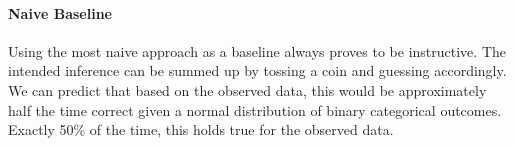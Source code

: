 \documentclass[
]{article}
\newenvironment{Shaded}{\begin{snugshade}}{\end{snugshade}}
\newcommand{\AttributeTok}[1]{\textcolor[rgb]{0.77,0.63,0.00}{#1}}
\newcommand{\CommentTok}[1]{\textcolor[rgb]{0.56,0.35,0.01}{\textit{#1}}}
\newcommand{\ConstantTok}[1]{\textcolor[rgb]{0.00,0.00,0.00}{#1}}
\newcommand{\FunctionTok}[1]{\textcolor[rgb]{0.00,0.00,0.00}{#1}}
\newcommand{\NormalTok}[1]{#1}
\newcommand{\OtherTok}[1]{\textcolor[rgb]{0.56,0.35,0.01}{#1}}
\newcommand{\SpecialCharTok}[1]{\textcolor[rgb]{0.00,0.00,0.00}{#1}}
\newcommand{\StringTok}[1]{\textcolor[rgb]{0.31,0.60,0.02}{#1}}
\begin{document}
\begin{Shaded}
\end{Shaded}

\hypertarget{naive-baseline}{%
\paragraph{Naive Baseline}\label{naive-baseline}}

Using the most naive approach as a baseline always proves to be
instructive. The intended inference can be summed up by tossing a coin
and guessing accordingly. We can predict that based on the observed
data, this would be approximately half the time correct given a normal
distribution of binary categorical outcomes. Exactly 50\% of the time,
this holds true for the observed data.
\end{document}
